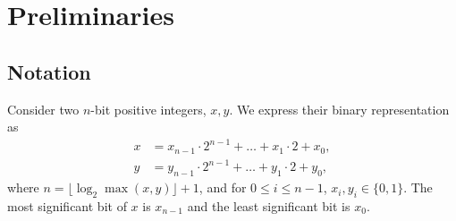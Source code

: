 \documentclass[reprint,amsmath,amssymb,aps,pra]{revtex4-2}
\begin{document}

\section{Preliminaries} \label{sec:prelim}

\subsection{Notation}\label{subsec:math}
Consider two $n$-bit positive integers, $x,y$. We express their binary representation as
\begin{align}
    x &= x_{n-1}\cdot2^{n-1}+\dots+x_1\cdot2+x_0, \label{eq:DefnX}\\
    y &= y_{n-1}\cdot2^{n-1}+\dots+y_1\cdot2+y_0,
\end{align}
where $n = \lfloor\log_2{\max{(x,y)}}\rfloor+1$, and for $0\le i \le n-1$, $x_i,y_i \in \{0,1\}$. The most significant bit of $x$ is $x_{n-1}$ and the least significant bit is $x_0$.
\end{document}
